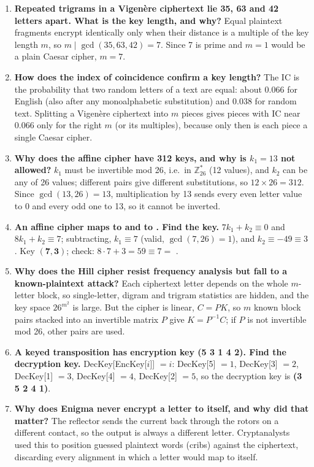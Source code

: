 \begin{enumerate}[leftmargin=1.6em,itemsep=3pt]
  \item \textbf{Repeated trigrams in a Vigen\`ere ciphertext lie 35, 63 and 42 letters apart. What is the key length, and why?} Equal plaintext fragments encrypt identically only when their distance is a multiple of the key length $m$, so $m \mid \gcd(35, 63, 42) = 7$. Since 7 is prime and $m = 1$ would be a plain Caesar cipher, $m = 7$.
  \item \textbf{How does the index of coincidence confirm a key length?} The IC is the probability that two random letters of a text are equal: about 0.066 for English (also after any monoalphabetic substitution) and 0.038 for random text. Splitting a Vigen\`ere ciphertext into $m$ pieces gives pieces with IC near 0.066 only for the right $m$ (or its multiples), because only then is each piece a single Caesar cipher.
  \item \textbf{Why does the affine cipher have 312 keys, and why is $k_1 = 13$ not allowed?} $k_1$ must be invertible mod 26, i.e.\ in $\mathbb{Z}_{26}^*$ (12 values), and $k_2$ can be any of 26 values; different pairs give different substitutions, so $12 \times 26 = 312$. Since $\gcd(13, 26) = 13$, multiplication by 13 sends every even letter value to 0 and every odd one to 13, so it cannot be inverted.
  \item \textbf{An affine cipher maps  to  and  to . Find the key.} $7k_1 + k_2 \equiv 0$ and $8k_1 + k_2 \equiv 7$; subtracting, $k_1 \equiv 7$ (valid, $\gcd(7,26) = 1$), and $k_2 \equiv -49 \equiv 3$. Key $\mathbf{(7, 3)}$; check: $8 \cdot 7 + 3 = 59 \equiv 7 = $ .
  \item \textbf{Why does the Hill cipher resist frequency analysis but fall to a known-plaintext attack?} Each ciphertext letter depends on the whole $m$-letter block, so single-letter, digram and trigram statistics are hidden, and the key space $26^{m^2}$ is large. But the cipher is linear, $C = PK$, so $m$ known block pairs stacked into an invertible matrix $P$ give $K = P^{-1}C$; if $P$ is not invertible mod 26, other pairs are used.
  \item \textbf{A keyed transposition has encryption key (5 3 1 4 2). Find the decryption key.} DecKey[EncKey[$i$]] $= i$: DecKey[5] $= 1$, DecKey[3] $= 2$, DecKey[1] $= 3$, DecKey[4] $= 4$, DecKey[2] $= 5$, so the decryption key is \textbf{(3 5 2 4 1)}.
  \item \textbf{Why does Enigma never encrypt a letter to itself, and why did that matter?} The reflector sends the current back through the rotors on a different contact, so the output is always a different letter. Cryptanalysts used this to position guessed plaintext words (cribs) against the ciphertext, discarding every alignment in which a letter would map to itself.

\end{enumerate}
